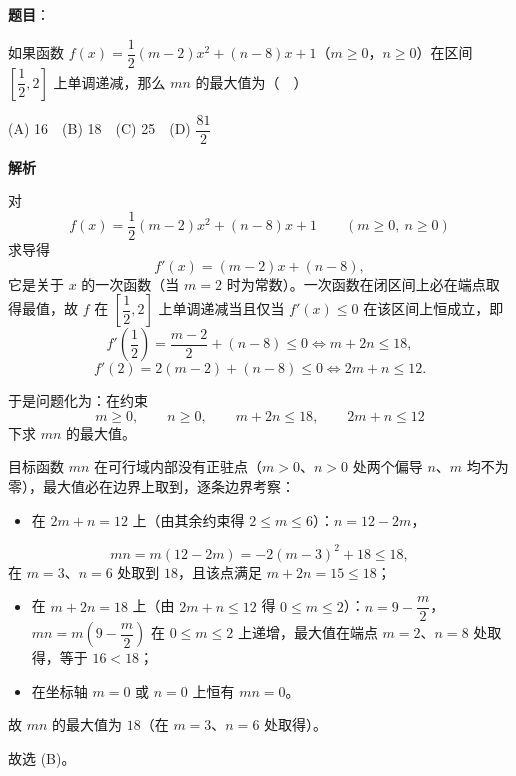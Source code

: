 \begin{answer}

\textbf{题目}：

如果函数 \(f(x)=\dfrac{1}{2}(m-2)x^2+(n-8)x+1\)（\(m\geqslant 0\)，\(n\geqslant 0\)）在区间 \(\left[\dfrac{1}{2},2\right]\) 上单调递减，那么 \(mn\) 的最大值为（　）

(A) 16　(B) 18　(C) 25　(D) \(\dfrac{81}{2}\)

\textbf{解析}

对
\nopagebreak[4]
\[
f(x)=\dfrac{1}{2}(m-2)x^2+(n-8)x+1\qquad (m\geqslant0,\ n\geqslant0)
\]
求导得
\nopagebreak[4]
\[
f'(x)=(m-2)x+(n-8),
\]
它是关于 \(x\) 的一次函数（当 \(m=2\) 时为常数）。一次函数在闭区间上必在端点取得最值，故 \(f\) 在 \(\left[\dfrac{1}{2},2\right]\) 上单调递减当且仅当 \(f'(x)\leqslant0\) 在该区间上恒成立，即
\nopagebreak[4]
\[
f'\left(\dfrac{1}{2}\right)=\dfrac{m-2}{2}+(n-8)\leqslant0\iff m+2n\leqslant18,
\]
\nopagebreak[4]
\[
f'(2)=2(m-2)+(n-8)\leqslant0\iff 2m+n\leqslant12 .
\]

于是问题化为：在约束
\nopagebreak[4]
\[
m\geqslant0,\qquad n\geqslant0,\qquad m+2n\leqslant18,\qquad 2m+n\leqslant12
\]
下求 \(mn\) 的最大值。

目标函数 \(mn\) 在可行域内部没有正驻点（\(m>0\)、\(n>0\) 处两个偏导 \(n\)、\(m\) 均不为零），最大值必在边界上取到，逐条边界考察：

\begin{itemize}
\item 在 \(2m+n=12\) 上（由其余约束得 \(2\leqslant m\leqslant6\)）：\(n=12-2m\)，
\end{itemize}
\nopagebreak[4]
\[
mn=m(12-2m)=-2(m-3)^2+18\leqslant18,
\]
在 \(m=3\)、\(n=6\) 处取到 \(18\)，且该点满足 \(m+2n=15\leqslant18\)；
\begin{itemize}
\item 在 \(m+2n=18\) 上（由 \(2m+n\leqslant12\) 得 \(0\leqslant m\leqslant2\)）：\(n=9-\dfrac{m}{2}\)，\(mn=m\left(9-\dfrac{m}{2}\right)\) 在 \(0\leqslant m\leqslant2\) 上递增，最大值在端点 \(m=2\)、\(n=8\) 处取得，等于 \(16<18\)；
\item 在坐标轴 \(m=0\) 或 \(n=0\) 上恒有 \(mn=0\)。
\end{itemize}

故 \(mn\) 的最大值为 \(18\)（在 \(m=3\)、\(n=6\) 处取得）。

故选 (B)。


\end{answer}
